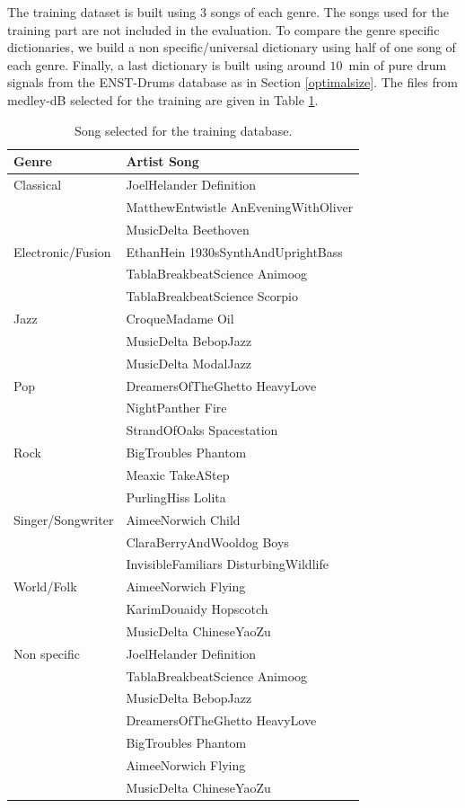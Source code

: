 \documentclass{article}
\begin{document}
The training dataset is built using $3$ songs of each genre. The songs used for the training part are not included in the evaluation. To compare the genre specific dictionaries, we build a non specific/universal dictionary using half of one song of each genre. Finally, a last dictionary is built using around $10$~min of pure drum signals from the ENST-Drums database as in Section \ref{optimalsize}. The files from medley-dB selected for the training are given in Table \ref{trainingdata}. 


\begin{table} 
	\centering 
	\small
   \begin{tabular}{|l|l|}
   \hline
   Genre & Artist Song \\
   	\hline   
Classical  & JoelHelander Definition \\
 & MatthewEntwistle AnEveningWithOliver \\
 & MusicDelta Beethoven \\
\hline
Electronic/Fusion & EthanHein 1930sSynthAndUprightBass \\
 & TablaBreakbeatScience Animoog \\
 & TablaBreakbeatScience Scorpio \\
\hline
Jazz & CroqueMadame Oil \\
 & MusicDelta BebopJazz \\
 & MusicDelta ModalJazz \\
\hline
Pop &  DreamersOfTheGhetto HeavyLove \\
 & NightPanther Fire \\
 & StrandOfOaks Spacestation \\
\hline
Rock & BigTroubles Phantom \\
 & Meaxic TakeAStep \\
 & PurlingHiss Lolita \\
\hline
Singer/Songwriter	& AimeeNorwich Child \\
 & ClaraBerryAndWooldog Boys \\
 & InvisibleFamiliars DisturbingWildlife \\
\hline
World/Folk & AimeeNorwich Flying \\
 &KarimDouaidy Hopscotch \\
 & MusicDelta ChineseYaoZu\\
\hline
Non specific & JoelHelander Definition \\
 & TablaBreakbeatScience Animoog \\
 & MusicDelta BebopJazz \\
 & DreamersOfTheGhetto HeavyLove \\
 &  BigTroubles Phantom \\
 & AimeeNorwich Flying \\
 &  MusicDelta ChineseYaoZu\\
 \hline

  
\end{tabular} 
\caption{\label{trainingdata} Song selected for the training database.}

\end{table}
\end{document}
